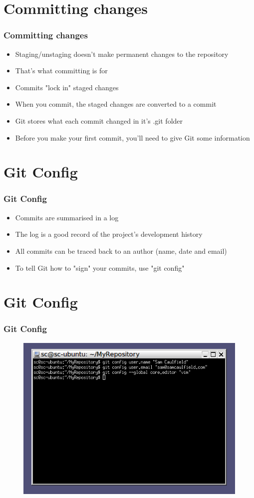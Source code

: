 \documentclass{beamer}
\begin{document}
\section{Committing changes}
\begin{frame}
\frametitle{Committing changes}
\begin{itemize}
\item Staging/unstaging doesn't make permanent changes to the repository
\item That's what committing is for
\item Commits "lock in" staged changes
\item When you commit, the staged changes are converted to a commit
\item Git stores what each commit changed in it's .git folder
\item Before you make your first commit, you'll need to give Git some information
\end{itemize}
\end{frame}

\section{Git Config}
\begin{frame}
\frametitle{Git Config}
\begin{itemize}
\item Commits are summarised in a log
\item The log is a good record of the project's development history
\item All commits can be traced back to an author (name, date and email)
\item To tell Git how to "sign" your commits, use "git config"
\end{itemize}
\end{frame}

\section{Git Config}
\begin{frame}
\frametitle{Git Config}
\begin{figure}
\includegraphics[scale=0.5]{gitconfig}
\end{figure}
\end{frame}
\end{document}
